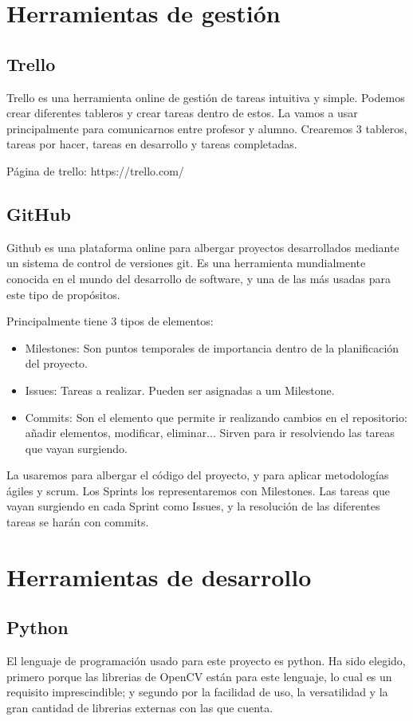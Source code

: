 \section{Herramientas de gestión}

\subsection{Trello}
Trello es una herramienta online de gestión de tareas intuitiva y simple. Podemos crear diferentes tableros y crear tareas dentro de estos. La vamos a usar principalmente para comunicarnos entre profesor y alumno. Crearemos 3 tableros, tareas por hacer, tareas en desarrollo y tareas completadas.

Página de trello: https://trello.com/

\subsection{GitHub}
Github es una plataforma online para albergar proyectos desarrollados mediante un sistema de control de versiones git. 
Es una herramienta mundialmente conocida en el mundo del desarrollo de software, y una de las más usadas para este tipo de propósitos.

Principalmente tiene 3 tipos de elementos:
\begin{itemize}
	\item Milestones: Son puntos temporales de importancia dentro de la planificación del proyecto.
	\item Issues: Tareas a realizar. Pueden ser asignadas a um Milestone. 
 	\item Commits: Son el elemento que permite ir realizando cambios en el repositorio: añadir elementos, modificar, eliminar... Sirven para ir resolviendo las tareas que vayan surgiendo.
\end{itemize}

La usaremos para albergar el código del proyecto, y para aplicar metodologías ágiles y scrum. Los Sprints los representaremos con Milestones. Las tareas que vayan surgiendo en cada Sprint como Issues, y la resolución de las diferentes tareas se harán con commits.


\section{Herramientas de desarrollo}

\subsection{Python}
El lenguaje de programación usado para este proyecto es python. Ha sido elegido, primero porque las librerias de OpenCV están para este lenguaje, lo cual es un requisito imprescindible; y segundo por la facilidad de uso, la versatilidad y la gran cantidad de librerias externas con las que cuenta.

